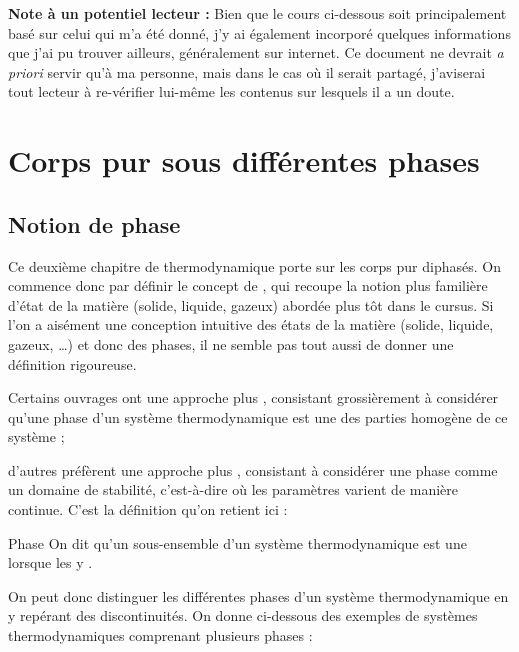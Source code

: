 \documentclass[a4paper,french,bookmarks]{article}
\begin{document}

\initcours{}

{\sffamily \bfseries Note à un potentiel lecteur :} Bien que le cours ci-dessous soit principalement basé sur celui qui m'a été donné, j'y ai également incorporé quelques informations que j'ai pu trouver ailleurs, généralement sur internet. Ce document ne devrait \textit{a priori} servir qu'à ma personne, mais dans le cas où il serait partagé, j'aviserai tout lecteur à re-vérifier lui-même les contenus sur lesquels il a un doute.

\section{Corps pur sous différentes phases}

\subsection{Notion de phase}

Ce deuxième chapitre de thermodynamique porte sur les corps pur diphasés. On commence donc par définir le concept de , qui recoupe la notion plus familière d'état de la matière (solide, liquide, gazeux) abordée plus tôt dans le cursus. Si l'on a aisément une conception intuitive des états de la matière (solide, liquide, gazeux, \dots) et donc des phases, il ne semble pas tout aussi de donner une définition rigoureuse.

\begin{enumerate}
    \itt Certains ouvrages ont une approche plus , consistant grossièrement à considérer qu'une phase d'un système thermodynamique est une des parties homogène de ce système ;
    
    \itt d'autres préfèrent une approche plus , consistant à considérer une phase comme un domaine de stabilité, c'est-à-dire où les paramètres varient de manière continue. C'est la définition qu'on retient ici :
\end{enumerate} 

\begin{definition}{Phase}{}
    On dit qu'un sous-ensemble d'un système thermodynamique est une  lorsque les  y .
\end{definition}

On peut donc distinguer les différentes phases d'un système thermodynamique en y repérant des discontinuités. On donne ci-dessous des exemples de systèmes thermodynamiques comprenant plusieurs phases :
\end{document}
